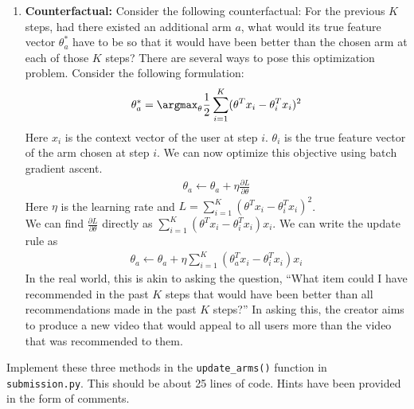 \begin{enumerate}[(1)]
\item \textbf{Counterfactual:} Consider the following counterfactual: For the previous $K$ steps, had there existed an additional arm $a$, what would its true feature vector $\theta_a^*$ have to be so that it would have been better than the chosen arm at each of those $K$ steps? There are several ways to pose this optimization problem. Consider the following formulation:
\begin{align}
    \theta_a^* = \argmax_{\theta} \frac{1}{2}\sum_{i=1}^{K}(\theta^Tx_i - \theta_i^Tx_i)^2
\end{align}
Here $x_i$ is the context vector of the user at step $i$. $\theta_i$ is the true feature vector of the arm chosen at step $i$. We can now optimize this objective using batch gradient ascent.\\
\begin{align}
    \theta_a \leftarrow \theta_a + \eta \frac{\partial L}{\partial \theta}
\end{align}
Here $\eta$ is the learning rate and $L = \sum_{i=1}^{K}(\theta^Tx_i - \theta_i^Tx_i)^2$.\\
We can find $\frac{\partial L}{\partial \theta}$ directly as $\sum_{i=1}^{K} (\theta^Tx_i - \theta_i^Tx_i)x_i$. We can write the update rule as \\
\begin{align}
    \theta_a \leftarrow \theta_a + \eta \sum_{i=1}^{K} (\theta_a^Tx_i - \theta_i^Tx_i)x_i
\end{align}
In the real world, this is akin to asking the question, ``What item could I have recommended in the past $K$ steps that would have been better than all recommendations made in the past $K$ steps?'' In asking this, the creator aims to produce a new video that would appeal to all users more than the video that was recommended to them.
\end{enumerate}

\item {} Implement these three methods in the \texttt{update\_arms()} function in \texttt{submission.py}. This should be about 25 lines of code. Hints have been provided in the form of comments.
